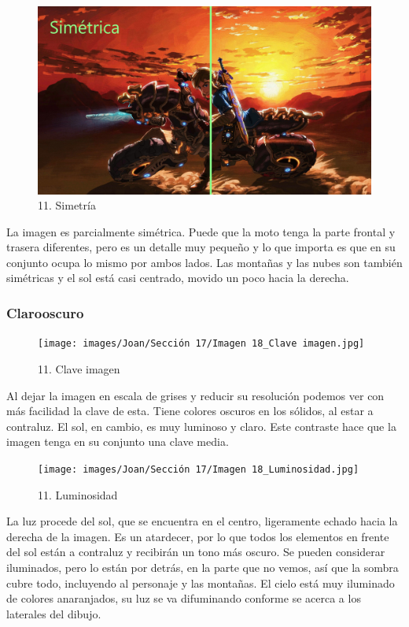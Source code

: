 \documentclass[12pt]{article}
\begin{document}
    \begin{figure}[H]
          \centering
          \includegraphics[scale=0.35]{images/Joan/Sección 17/Imagen 18_Simetría.jpg}
          \caption{\small 11. Simetría}
        \end{figure}
        La imagen es parcialmente simétrica. Puede que la moto tenga la parte frontal y trasera diferentes, pero es un detalle muy pequeño y lo que importa es que en su conjunto ocupa lo mismo por ambos lados. Las montañas y las nubes son también simétricas y el sol está casi centrado, movido un poco hacia la derecha. 

            \subsubsection{Clarooscuro}
            \begin{figure}[H]
          \centering
          \texttt{[image: images/Joan/Sección 17/Imagen 18\_Clave imagen.jpg]}
          \caption{\small 11. Clave imagen}
        \end{figure}
        Al dejar la imagen en escala de grises y reducir su resolución podemos ver con más facilidad la clave de esta. Tiene colores oscuros en los sólidos, al estar a contraluz. El sol, en cambio, es muy luminoso y claro. Este contraste hace que la imagen tenga en su conjunto una clave media. 

        \begin{figure}[H]
          \centering
          \texttt{[image: images/Joan/Sección 17/Imagen 18\_Luminosidad.jpg]}
          \caption{\small 11. Luminosidad}
        \end{figure}

        La luz procede del sol, que se encuentra en el centro, ligeramente echado hacia la derecha de la imagen. Es un atardecer, por lo que todos los elementos en frente del sol están a contraluz y recibirán un tono más oscuro. Se pueden considerar iluminados, pero lo están por detrás, en la parte que no vemos, así que la sombra cubre todo, incluyendo al personaje y las montañas. El cielo está muy iluminado de colores anaranjados, su luz se va difuminando conforme se acerca a los laterales del dibujo. 
\end{document}
